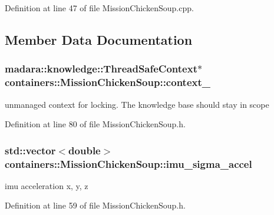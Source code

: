 Definition at line 47 of file Mission\+Chicken\+Soup.\+cpp.



\subsection{Member Data Documentation}
\subsubsection[{\texorpdfstring{context\+\_\+}{context_}}]{\setlength{\rightskip}{0pt plus 5cm}madara\+::knowledge\+::\+Thread\+Safe\+Context$\ast$ containers\+::\+Mission\+Chicken\+Soup\+::context\+\_\+\hspace{0.3cm}{\ttfamily [private]}}\hypertarget{classcontainers_1_1MissionChickenSoup_a645607952609f9c2faa48f89809782f1}{}\label{classcontainers_1_1MissionChickenSoup_a645607952609f9c2faa48f89809782f1}


unmanaged context for locking. The knowledge base should stay in scope 



Definition at line 80 of file Mission\+Chicken\+Soup.\+h.

\subsubsection[{\texorpdfstring{imu\+\_\+sigma\+\_\+accel}{imu_sigma_accel}}]{\setlength{\rightskip}{0pt plus 5cm}std\+::vector$<$double$>$ containers\+::\+Mission\+Chicken\+Soup\+::imu\+\_\+sigma\+\_\+accel}\hypertarget{classcontainers_1_1MissionChickenSoup_a52f8070421852b085217ac745924d3e1}{}\label{classcontainers_1_1MissionChickenSoup_a52f8070421852b085217ac745924d3e1}


imu acceleration x, y, z 



Definition at line 59 of file Mission\+Chicken\+Soup.\+h.

